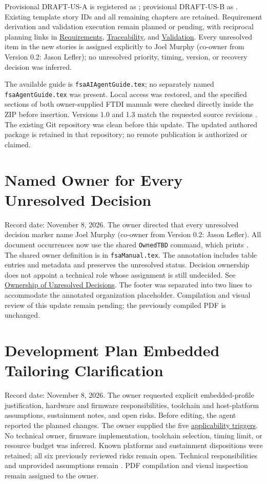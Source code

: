 Provisional DRAFT-US-A is registered as ; provisional
DRAFT-US-B as . Existing template story IDs and all
remaining chapters are retained. Requirement derivation and validation
execution remain planned or pending, with reciprocal planning links in
\hyperref[Section:DraftStoryRequirements]{Requirements},
\hyperref[Section:DraftStoryTraceability]{Traceability}, and
\hyperref[Section:DraftStoryValidation]{Validation}. Every unresolved item
in the new stories is assigned explicitly to Joel Murphy (co-owner from Version 0.2: Jason Lefler); no unresolved
priority, timing, version, or recovery decision was inferred.

The available guide is \texttt{fsaAIAgentGuide.tex}; no separately named
\texttt{fsaAgentGuide.tex} was present. Local access was restored, and the
specified sections of both owner-supplied FTDI manuals were checked directly
inside the ZIP before insertion. Versions 1.0 and 1.3 match the requested
source revisions \cite{FTDI_TN167_v1_0,FTDI_D2XX_v1_3}. The existing Git
repository was clean before this update. The updated authored package is
retained in that repository; no remote publication is authorized or claimed.

\section{Named Owner for Every Unresolved Decision}
\label{Section:TBDOwnershipPromptLog}
Record date: November 8, 2026. The owner directed that every unresolved
decision marker name Joel Murphy (co-owner from Version 0.2: Jason Lefler). All document occurrences now use the shared
\texttt{OwnedTBD} command, which prints \OwnedTBD{}. The shared owner definition
is in \texttt{fsaManual.tex}. The annotation includes table entries and metadata
and preserves the unresolved status. Decision ownership does not appoint a
technical role whose assignment is still undecided. See
\hyperref[Section:TBDDecisionOwnership]{Ownership of Unresolved Decisions}.
The footer was separated into two lines to accommodate the annotated
organization placeholder. Compilation and visual review of this update remain
pending; the previously compiled PDF is unchanged.

\section{Development Plan Embedded Tailoring Clarification}
\label{Section:DevelopmentPlanTailoringPromptLog}
Record date: November 8, 2026. The owner requested explicit embedded-profile
justification, hardware and firmware responsibilities, toolchain and
host-platform assumptions, sustainment notes, and open risks. Before editing,
the agent reported the planned changes. The owner supplied the five
\hyperref[Section:EmbeddedApplicabilityTriggers]{applicability triggers}.
No technical owner, firmware implementation, toolchain selection, timing
limit, or resource budget was inferred. Known platforms and sustainment
dispositions were retained; all six previously reviewed risks remain open.
Technical responsibilities and unprovided assumptions remain \OwnedTBD{}. PDF
compilation and visual inspection remain assigned to the owner.

